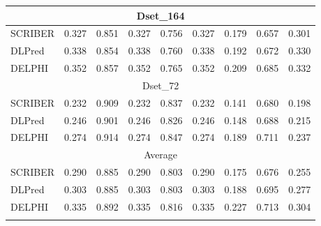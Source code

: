 \documentclass{bioinfo}
\begin{document}
\begin{table}[H]
\begin{tabular}{@{}l@{\ }*{8}{r}}
    \hline
    \multicolumn{9}{c}{Dset\_164} \\
    \hline
    SCRIBER & 0.327 & 0.851 & 0.327 & 0.756 & 0.327 & 0.179 & 0.657 & 0.301 \\
    DLPred & \cellcolor[rgb]{ .714,  .792,  .663}0.338 & \cellcolor[rgb]{ .71,  .788,  .659}0.854 & \cellcolor[rgb]{ .714,  .792,  .663}0.338 & \cellcolor[rgb]{ .714,  .788,  .659}0.760 & \cellcolor[rgb]{ .714,  .792,  .663}0.338 & \cellcolor[rgb]{ .714,  .792,  .663}0.192 & \cellcolor[rgb]{ .635,  .733,  .569}0.672 & \cellcolor[rgb]{ .365,  .537,  .251}0.330 \\
    DELPHI & \cellcolor[rgb]{ .329,  .51,  .208}0.352 & \cellcolor[rgb]{ .329,  .51,  .208}0.857 & \cellcolor[rgb]{ .329,  .51,  .208}0.352 & \cellcolor[rgb]{ .329,  .51,  .208}0.765 & \cellcolor[rgb]{ .329,  .51,  .208}0.352 & \cellcolor[rgb]{ .329,  .51,  .208}0.209 & \cellcolor[rgb]{ .329,  .51,  .208}0.685 & \cellcolor[rgb]{ .329,  .51,  .208}0.332 \\
    \hline
    \multicolumn{9}{c}{Dset\_72} \\
    \hline
    SCRIBER & 0.232 & \cellcolor[rgb]{ .612,  .718,  .541}0.909 & 0.232 & \cellcolor[rgb]{ .635,  .733,  .569}0.837 & 0.232 & 0.141 & 0.680 & 0.198 \\
    DLPred & \cellcolor[rgb]{ .776,  .839,  .737}0.246 & 0.901 & \cellcolor[rgb]{ .776,  .839,  .737}0.246 & 0.826 & \cellcolor[rgb]{ .776,  .839,  .737}0.246 & \cellcolor[rgb]{ .91,  .937,  .894}0.148 & \cellcolor[rgb]{ .82,  .867,  .784}0.688 & \cellcolor[rgb]{ .706,  .784,  .651}0.215 \\
    DELPHI & \cellcolor[rgb]{ .329,  .51,  .208}0.274 & \cellcolor[rgb]{ .329,  .51,  .208}0.914 & \cellcolor[rgb]{ .329,  .51,  .208}0.274 & \cellcolor[rgb]{ .329,  .51,  .208}0.847 & \cellcolor[rgb]{ .329,  .51,  .208}0.274 & \cellcolor[rgb]{ .329,  .51,  .208}0.189 & \cellcolor[rgb]{ .329,  .51,  .208}0.711 & \cellcolor[rgb]{ .329,  .51,  .208}0.237 \\
    \hline
    \multicolumn{9}{c}{Average} \\
    \hline
    SCRIBER & 0.290 & 0.885 & 0.290 & 0.803 & 0.290 & 0.175 & 0.676 & 0.255 \\
    DLPred & \cellcolor[rgb]{ .812,  .863,  .776}0.303 & \cellcolor[rgb]{ .992,  .992,  .988}0.885 & \cellcolor[rgb]{ .808,  .859,  .773}0.303 & \cellcolor[rgb]{ .976,  .984,  .973}0.803 & \cellcolor[rgb]{ .808,  .863,  .773}0.303 & \cellcolor[rgb]{ .835,  .882,  .804}0.188 & \cellcolor[rgb]{ .659,  .753,  .6}0.695 & \cellcolor[rgb]{ .702,  .784,  .647}0.277 \\
    DELPHI & \cellcolor[rgb]{ .329,  .51,  .208}0.335 & \cellcolor[rgb]{ .329,  .51,  .208}0.892 & \cellcolor[rgb]{ .329,  .51,  .208}0.335 & \cellcolor[rgb]{ .329,  .51,  .208}0.816 & \cellcolor[rgb]{ .329,  .51,  .208}0.335 & \cellcolor[rgb]{ .329,  .51,  .208}0.227 & \cellcolor[rgb]{ .329,  .51,  .208}0.713 & \cellcolor[rgb]{ .329,  .51,  .208}0.304 \\
\label{tab_ds355_ds186_164_72}
    \end{tabular}%
\end{table}%
\end{document}
